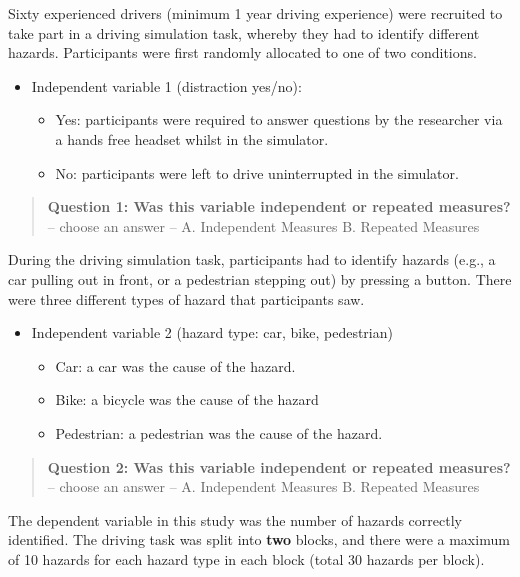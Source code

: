 \documentclass[
]{book}
\begin{document}
Sixty experienced drivers (minimum 1 year driving experience) were recruited to take part in a driving simulation task, whereby they had to identify different hazards. Participants were first randomly allocated to one of two conditions.

\begin{itemize}
\item
  Independent variable 1 (distraction yes/no):

  \begin{itemize}
  \item
    Yes: participants were required to answer questions by the researcher via a hands free headset whilst in the simulator.
  \item
    No: participants were left to drive uninterrupted in the simulator.
  \end{itemize}
\end{itemize}

\begin{quote}
\textbf{Question 1: Was this variable independent or repeated measures?} -- choose an answer -- A. Independent Measures B. Repeated Measures
\end{quote}

During the driving simulation task, participants had to identify hazards (e.g., a car pulling out in front, or a pedestrian stepping out) by pressing a button. There were three different types of hazard that participants saw.

\begin{itemize}
\item
  Independent variable 2 (hazard type: car, bike, pedestrian)

  \begin{itemize}
  \item
    Car: a car was the cause of the hazard.
  \item
    Bike: a bicycle was the cause of the hazard
  \item
    Pedestrian: a pedestrian was the cause of the hazard.
  \end{itemize}
\end{itemize}

\begin{quote}
\textbf{Question 2: Was this variable independent or repeated measures?} -- choose an answer -- A. Independent Measures B. Repeated Measures
\end{quote}

The dependent variable in this study was the number of hazards correctly identified. The driving task was split into \textbf{two} blocks, and there were a maximum of 10 hazards for each hazard type in each block (total 30 hazards per block).
\end{document}
